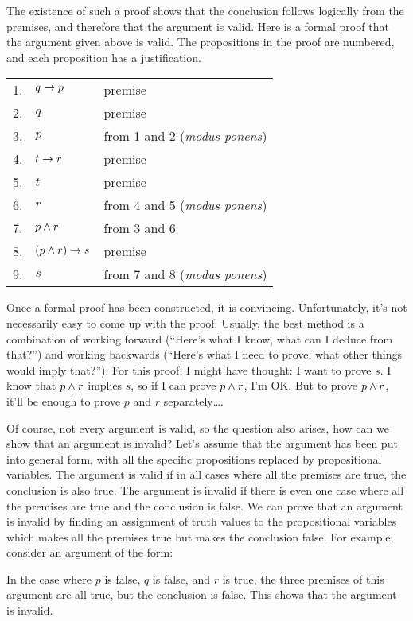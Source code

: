 The existence of such a proof shows that the conclusion follows
logically from the premises, and therefore that the argument is 
valid.  Here is a formal proof that the argument given above is valid.
The propositions in the proof are numbered, and each proposition
has a justification.
\begin{center}
  \begin{tabular}{r@{\ \ }l@{\qquad}l}
     1.&$q\rightarrow p$&    premise\\
     2.&$q$&          premise\\
     3.&$p$&          from 1 and 2 (\textit{modus ponens})\\
     4.&$t\rightarrow r$&    premise\\
     5.&$t$&          premise\\
     6.&$r$&          from 4 and 5 (\textit{modus ponens})\\
     7.&$p\wedge r$&    from 3 and 6\\
     8.&$(p\wedge r)\rightarrow s$& premise\\
     9.&$s$&          from 7 and 8 (\textit{modus ponens})\\
  \end{tabular}
\end{center}
Once a formal proof has been constructed, it is convincing.  Unfortunately,
it's not necessarily easy to come up with the proof.  Usually, the best
method is a combination of working forward (``Here's what I know, what
can I deduce from that?'') and working backwards (``Here's what I
need to prove, what other things would imply that?'').  For this proof,
I might have thought:  I want to prove $s$.  I know that
$p\wedge r$ implies $s$, so if I can prove $p\wedge r$, I'm OK.
But to prove $p\wedge r$, it'll be enough to prove $p$ and $r$ 
separately\dots.

Of course, not every argument is valid, so the question also
arises, how can we show that an argument is invalid?  Let's
assume that the argument has been put into general form, with
all the specific propositions replaced by propositional variables.
The argument is valid if in all cases where all the premises are
true, the conclusion is also true.  The argument is invalid if
there is even one case where all the premises are true and the
conclusion is false.  We can prove that an argument is invalid
by finding an assignment of truth values to the propositional variables
which makes all the premises true but makes the conclusion false.
For example, consider an argument of the form:
\begin{center}
\end{center}
In the case where $p$ is false, $q$ is false, and $r$ is true,
the three premises of this argument are all true, but the conclusion
is false.  This shows that the argument is invalid.

